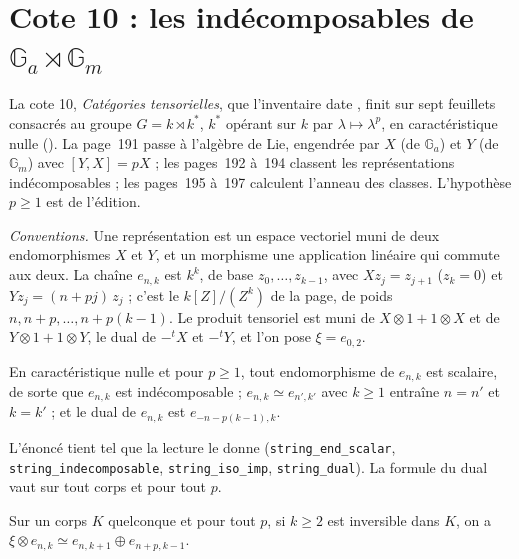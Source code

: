 \section[Cote 10 : les indécomposables de $\mathbb G_a \rtimes \mathbb G_m$]{Cote 10 : les indécomposables de $\mathbb G_a \rtimes \mathbb G_m$\protect{}}\label{sec:10}

La cote 10, \emph{Catégories tensorielles}, que l'inventaire date \q{[à partir de 1958]}, finit sur sept feuillets consacrés au groupe $G = k \rtimes k^*$, $k^*$ opérant sur $k$ par $\lambda \mapsto \lambda^p$, en caractéristique nulle (). La page~191 passe à l'algèbre de Lie, engendrée par $X$ (de $\mathbb G_a$) et $Y$ (de $\mathbb G_m$) avec $[Y, X] = pX$ ; les pages~192 à~194 classent les représentations indécomposables ; les pages~195 à~197 calculent l'anneau des classes. L'hypothèse $p \geq 1$ est de l'édition.

\noindent\emph{Conventions.} Une représentation est un espace vectoriel muni de deux endomorphismes $X$ et $Y$, et un morphisme une application linéaire qui commute aux deux. La chaîne $e_{n,k}$ est $k^k$, de base $z_0, \ldots, z_{k-1}$, avec $X z_j = z_{j+1}$ ($z_k = 0$) et $Y z_j = (n + pj)\, z_j$ ; c'est le $k[Z]/(Z^k)$ de la page, de poids $n, n + p, \ldots, n + p(k-1)$. Le produit tensoriel est muni de $X \otimes 1 + 1 \otimes X$ et de $Y \otimes 1 + 1 \otimes Y$, le dual de $-{}^tX$ et $-{}^tY$, et l'on pose $\xi = e_{0,2}$.

\begin{enonce}
En caractéristique nulle et pour $p \geq 1$, tout endomorphisme de $e_{n,k}$ est scalaire, de sorte que $e_{n,k}$ est indécomposable ; $e_{n,k} \simeq e_{n',k'}$ avec $k \geq 1$ entraîne $n = n'$ et $k = k'$ ; et le dual de $e_{n,k}$ est $e_{-n-p(k-1),k}$.
\end{enonce}

L'énoncé tient tel que la lecture le donne (\texttt{string\_end\_scalar}, \texttt{string\_indecomposable}, \texttt{string\_iso\_imp}, \texttt{string\_dual}). La formule du dual vaut sur tout corps et pour tout $p$.

\begin{enonce}
Sur un corps $K$ quelconque et pour tout $p$, si $k \geq 2$ est inversible dans $K$, on a $\xi \otimes e_{n,k} \simeq e_{n,k+1} \oplus e_{n+p,k-1}$.
\end{enonce}

